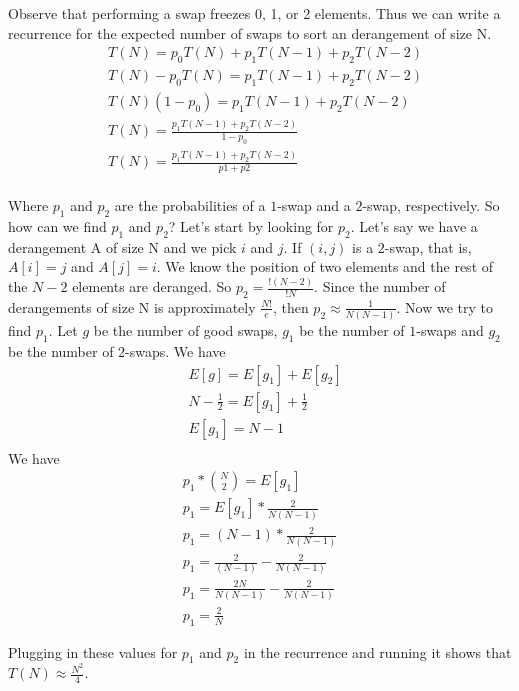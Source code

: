 \documentclass{article}
\begin{document}
Observe that performing a swap freezes 0, 1, or 2 elements. Thus we can write a recurrence
for the expected number of swaps to sort an derangement of size N.
\begin{align}
    & T(N) = p_0T(N) + p_1T(N - 1) + p_2T(N - 2) \\\nonumber
    & T(N) - p_0T(N) = p_1T(N - 1) + p_2T(N - 2) \\\nonumber
    & T(N)(1 - p_0) = p_1T(N - 1) + p_2T(N - 2) \\\nonumber
    & T(N) = \frac{p_1T(N - 1) + p_2T(N - 2)}{1 - p_0} \\\nonumber
    & T(N) = \frac{p_1T(N - 1) + p_2T(N - 2)}{p1 + p2} \\\nonumber
\end{align}

Where $p_1$ and $p_2$ are the probabilities of a $1$-swap and a $2$-swap, respectively.
So how can we find $p_1$ and $p_2$?
Let's start by looking for $p_2$. Let's say we have
a derangement A of size N and we pick $i$ and $j$. If $(i ,j)$ is a $2$-swap, that is,
$A[i] = j$ and $A[j] = i$. We know the position of two elements and the rest of the $N - 2$ elements
are deranged. So $p_2 = \frac{!(N - 2)}{!N}$. Since the number of derangements of size N is approximately
$\frac{N!}{e}$, then $p_2 \approx \frac{1}{N(N - 1)}$.
Now we try to find $p_1$. Let $g$ be the number of good swaps, $g_1$ be the number of $1$-swaps
and $g_2$ be the number of $2$-swaps. We have
\begin{align}
    & E[g] = E[g_1] + E[g_2] \\\nonumber
    & N - \frac{1}{2} = E[g_1] + \frac{1}{2} \\\nonumber
    & E[g_1] = N - 1  \\\nonumber
\end{align}
We have
\begin{align}
    p_1 * {N \choose 2} = E[g_1] \\\nonumber
    p_1 = E[g_1] * \frac{2}{N(N - 1)} \\\nonumber
    p_1 = (N - 1) * \frac{2}{N(N - 1)} \\\nonumber
    p_1 = \frac{2}{(N - 1)} - \frac{2}{N(N - 1)} \\\nonumber
    p_1 = \frac{2N}{N(N - 1)} - \frac{2}{N(N - 1)} \\\nonumber
    p_1 = \frac{2}{N}
\end{align}

Plugging in these values for $p_1$ and $p_2$ in the recurrence and running it shows
that $T(N) \approx \frac{N^2}{4}$.
\end{document}
